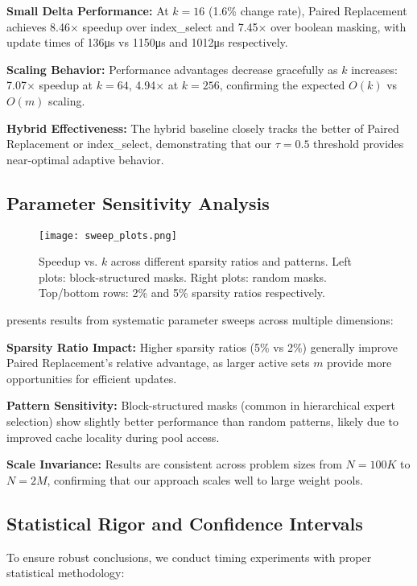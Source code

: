 \documentclass{article}
\numberwithin{equation}{section}
\theoremstyle{plain}
\theoremstyle{definition}
\theoremstyle{remark}
\begin{document}
\textbf{Small Delta Performance:} At $k=16$ (1.6\% change rate), Paired Replacement achieves 8.46$\times$ speedup over index\_select and 7.45$\times$ over boolean masking, with update times of 136μs vs 1150μs and 1012μs respectively.

\textbf{Scaling Behavior:} Performance advantages decrease gracefully as $k$ increases: 7.07$\times$ speedup at $k=64$, 4.94$\times$ at $k=256$, confirming the expected $O(k)$ vs $O(m)$ scaling.

\textbf{Hybrid Effectiveness:} The hybrid baseline closely tracks the better of Paired Replacement or index\_select, demonstrating that our $\tau=0.5$ threshold provides near-optimal adaptive behavior.

\subsection{Parameter Sensitivity Analysis}

\begin{figure}[t]
\centering
\texttt{[image: sweep\_plots.png]}
\caption{Speedup vs. $k$ across different sparsity ratios and patterns. Left plots: block-structured masks. Right plots: random masks. Top/bottom rows: 2\% and 5\% sparsity ratios respectively.}
\label{fig:parameter_sweep}
\end{figure}

 presents results from systematic parameter sweeps across multiple dimensions:

\textbf{Sparsity Ratio Impact:} Higher sparsity ratios (5\% vs 2\%) generally improve Paired Replacement's relative advantage, as larger active sets $m$ provide more opportunities for efficient updates.

\textbf{Pattern Sensitivity:} Block-structured masks (common in hierarchical expert selection) show slightly better performance than random patterns, likely due to improved cache locality during pool access.

\textbf{Scale Invariance:} Results are consistent across problem sizes from $N=100K$ to $N=2M$, confirming that our approach scales well to large weight pools.

\subsection{Statistical Rigor and Confidence Intervals}

To ensure robust conclusions, we conduct timing experiments with proper statistical methodology:
\end{document}
